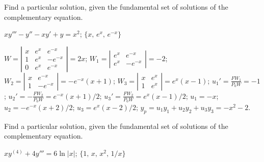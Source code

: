 \documentclass{ximera}
\begin{document}
\begin{problem}\label{exer:9.4.12} 
Find a particular
solution, given the fundamental set of solutions of the complementary equation.

$xy'''-y''-xy'+y=x^2$; \quad
$\{x,\,e^x,\,e^{-x}\}$

\begin{solution}
$W=\left|\begin{array}{cccc}x&e^x&e^{-x}\\
1&e^x&-e^{-x}\\0&e^x&e^{-x}
\end{array}\right|=2x$;
$W_1=\left|\begin{array}{cccc}
e^x&e^{-x}\\e^x&-e^{-x}
\end{array}\right|=-2$;
$W_2=\left|\begin{array}{cccc}
x&e^{-x}\\1&-e^{-x}
\end{array}\right|=-e^{-x}(x+1)$;
$W_3=\left|\begin{array}{cccc}x&e^x\\1&e^x
\end{array}\right|=e^x(x-1)$;
$u_1'=\frac{FW_1}{P_0W}=-1$;
$u_2'=-\frac{FW_2}{P_0W}=e^{-x}(x+1)/2$;
$u_3'=\frac{FW_2}{P_0W}=e^x(x-1)/2$;
$u_1=-x$;
$u_2=-e^{-x}(x+2)/2$;
$u_3=e^x(x-2)/2$;
$y_p=u_1y_1+u_2y_2+u_3y_3=-x^2-2$.
\end{solution}
\end{problem}

\begin{problem}\label{exer:9.4.13}
Find a particular
solution, given the fundamental set of solutions of the complementary equation.

$xy^{(4)}+4y'''=6 \ln |x|$; \quad   $\{1,\,x,\,x^2,\,1/x\}$
\end{problem}
\end{document}
